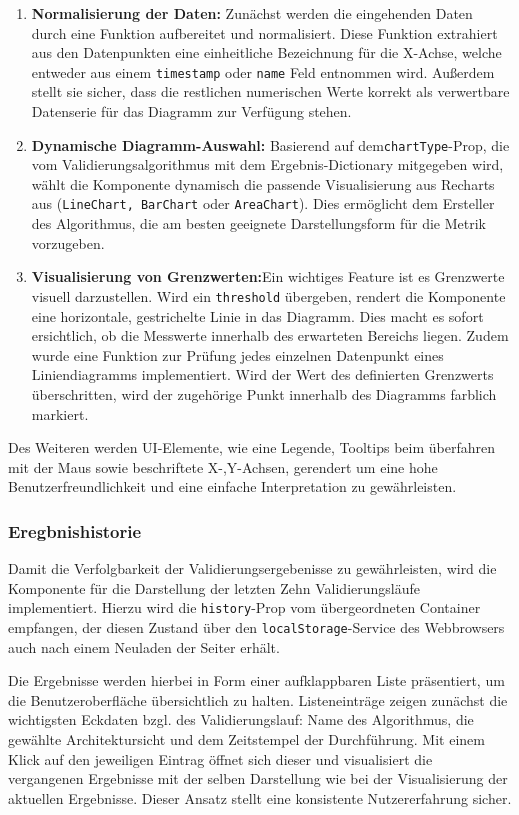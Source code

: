 \begin{enumerate}
  \item \textbf{Normalisierung der Daten:} Zunächst werden die eingehenden Daten durch eine Funktion aufbereitet und normalisiert. Diese Funktion extrahiert aus den Datenpunkten eine einheitliche Bezeichnung für die X-Achse, welche entweder aus einem \texttt{timestamp} oder \texttt{name} Feld entnommen wird. Außerdem stellt sie sicher, dass die restlichen numerischen Werte korrekt als verwertbare Datenserie für das Diagramm zur Verfügung stehen.
  \item \textbf{Dynamische Diagramm-Auswahl:} Basierend auf dem\texttt{chartType}-Prop, die vom Validierungsalgorithmus mit dem Ergebnis-Dictionary mitgegeben wird, wählt die Komponente dynamisch die passende Visualisierung aus Recharts aus (\texttt{LineChart, BarChart} oder \texttt{AreaChart}). Dies ermöglicht dem Ersteller des Algorithmus, die am besten geeignete Darstellungsform für die Metrik vorzugeben.
  \item \textbf{Visualisierung von Grenzwerten:}Ein wichtiges Feature ist es Grenzwerte visuell darzustellen. Wird ein \texttt{threshold} übergeben, rendert die Komponente eine horizontale, gestrichelte Linie in das Diagramm. Dies macht es sofort ersichtlich, ob die Messwerte innerhalb des erwarteten Bereichs liegen. Zudem wurde eine Funktion zur Prüfung jedes einzelnen Datenpunkt eines Liniendiagramms implementiert. Wird der Wert des definierten Grenzwerts überschritten, wird der zugehörige Punkt innerhalb des Diagramms farblich markiert.
\end{enumerate}

Des Weiteren werden UI-Elemente, wie eine Legende, Tooltips beim überfahren mit der Maus sowie beschriftete X-,Y-Achsen, gerendert um eine hohe Benutzerfreundlichkeit und eine einfache Interpretation zu gewährleisten.

\subsubsection*{Eregbnishistorie}

Damit die Verfolgbarkeit der Validierungsergebenisse zu gewährleisten, wird die Komponente für die Darstellung der letzten Zehn Validierungsläufe implementiert. Hierzu wird die \texttt{history}-Prop vom übergeordneten Container empfangen, der diesen Zustand über den \texttt{localStorage}-Service des Webbrowsers auch nach einem Neuladen der Seiter erhält.

Die Ergebnisse werden hierbei in Form einer aufklappbaren Liste präsentiert, um die Benutzeroberfläche übersichtlich zu halten. Listeneinträge zeigen zunächst die wichtigsten Eckdaten bzgl. des Validierungslauf: Name des Algorithmus, die gewählte Architektursicht und dem Zeitstempel der Durchführung. Mit einem Klick auf den jeweiligen Eintrag öffnet sich dieser und visualisiert die vergangenen Ergebnisse mit der selben Darstellung wie bei der Visualisierung der aktuellen Ergebnisse. Dieser Ansatz stellt eine konsistente Nutzererfahrung sicher.

